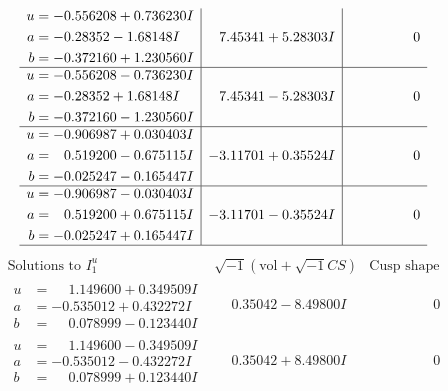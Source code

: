 \documentclass[1p]{elsarticle_modified}
\theoremstyle{definition}
\newcommand{\I}{\sqrt{-1}}
\begin{document}
$$\begin{array}{c|c|c}
\begin{aligned}
u &= -0.556208 + 0.736230 I \\
a &= -0.28352 - 1.68148 I \\
b &= -0.372160 + 1.230560 I\end{aligned}
 & \phantom{-}7.45341 + 5.28303 I & \phantom{-0.000000 } 0 \\ \hline\begin{aligned}
u &= -0.556208 - 0.736230 I \\
a &= -0.28352 + 1.68148 I \\
b &= -0.372160 - 1.230560 I\end{aligned}
 & \phantom{-}7.45341 - 5.28303 I & \phantom{-0.000000 } 0 \\ \hline\begin{aligned}
u &= -0.906987 + 0.030403 I \\
a &= \phantom{-}0.519200 - 0.675115 I \\
b &= -0.025247 - 0.165447 I\end{aligned}
 & -3.11701 + 0.35524 I & \phantom{-0.000000 } 0 \\ \hline\begin{aligned}
u &= -0.906987 - 0.030403 I \\
a &= \phantom{-}0.519200 + 0.675115 I \\
b &= -0.025247 + 0.165447 I\end{aligned}
 & -3.11701 - 0.35524 I & \phantom{-0.000000 } 0\\
 \hline 
 \end{array}$$\newpage$$\begin{array}{c|c|c}  
\text{Solutions to }I^u_{1}& \I (\text{vol} + \sqrt{-1}CS) & \text{Cusp shape}\\
 \hline 
\begin{aligned}
u &= \phantom{-}1.149600 + 0.349509 I \\
a &= -0.535012 + 0.432272 I \\
b &= \phantom{-}0.078999 - 0.123440 I\end{aligned}
 & \phantom{-}0.35042 - 8.49800 I & \phantom{-0.000000 } 0 \\ \hline\begin{aligned}
u &= \phantom{-}1.149600 - 0.349509 I \\
a &= -0.535012 - 0.432272 I \\
b &= \phantom{-}0.078999 + 0.123440 I\end{aligned}
 & \phantom{-}0.35042 + 8.49800 I & \phantom{-0.000000 } 0 \\ \hline\begin{aligned}

\end{aligned}
\end{array}$$
\end{document}
